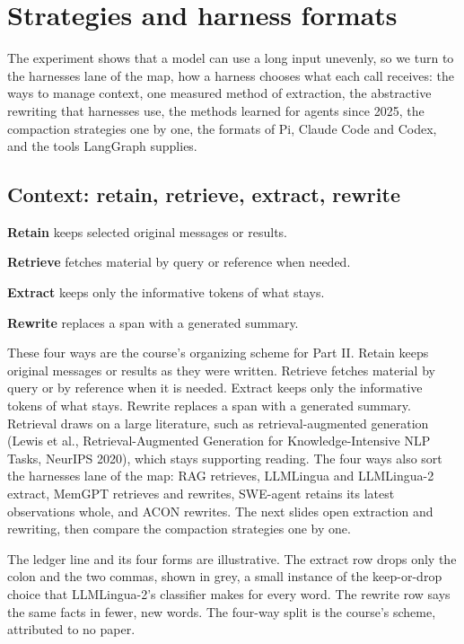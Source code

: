 \section{Strategies and harness formats}
\label{sec:row-1}

The experiment shows that a model can use a long input unevenly, so we turn to the harnesses lane of the map, how a harness chooses what each call receives: the ways to manage context, one measured method of extraction, the abstractive rewriting that harnesses use, the methods learned for agents since 2025, the compaction strategies one by one, the formats of Pi, Claude Code and Codex, and the tools LangGraph supplies.

\subsection{Context: retain, retrieve, extract, rewrite}
\label{sec:it-7-1}

\bi
\item \textbf{Retain} keeps selected original messages or results.
\item \textbf{Retrieve} fetches material by query or reference when needed.
\item \textbf{Extract} keeps only the informative tokens of what stays.
\item \textbf{Rewrite} replaces a span with a generated summary.
\ei

These four ways are the course's organizing scheme for Part II. Retain keeps original messages or results as they were written. Retrieve fetches material by query or by reference when it is needed. Extract keeps only the informative tokens of what stays. Rewrite replaces a span with a generated summary. Retrieval draws on a large literature, such as retrieval-augmented generation (Lewis et al., Retrieval-Augmented Generation for Knowledge-Intensive NLP Tasks, NeurIPS 2020), which stays supporting reading. The four ways also sort the harnesses lane of the map: RAG retrieves, LLMLingua and LLMLingua-2 extract, MemGPT retrieves and rewrites, SWE-agent retains its latest observations whole, and ACON rewrites. The next slides open extraction and rewriting, then compare the compaction strategies one by one.

The ledger line and its four forms are illustrative. The extract row drops only the colon and the two commas, shown in grey, a small instance of the keep-or-drop choice that LLMLingua-2's classifier makes for every word. The rewrite row says the same facts in fewer, new words. The four-way split is the course's scheme, attributed to no paper.

